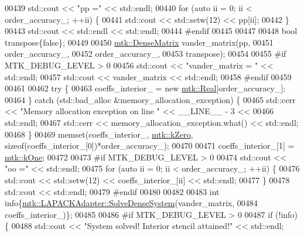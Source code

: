 \begin{DoxyCode}
{{00439   std::cout << \textcolor{stringliteral}{"pp ="} << std::endl;
00440   \textcolor{keywordflow}{for} (\textcolor{keyword}{auto} ii = 0; ii < order\_accuracy\_; ++ii) \{
00441     std::cout << std::setw(12) << pp[ii];
00442   \}
00443   std::cout << std::endl << std::endl;
00444 \textcolor{preprocessor}{  #endif}
00445 
00447 
00448   \textcolor{keywordtype}{bool} transpose\{\textcolor{keyword}{false}\};
00449 
00450   \hyperlink{classmtk_1_1DenseMatrix}{mtk::DenseMatrix} vander\_matrix(pp,
00451                                  order\_accuracy\_,
00452                                  order\_accuracy\_,
00453                                  transpose);
00454 
00455 \textcolor{preprocessor}{  #if MTK\_DEBUG\_LEVEL > 0}
00456   std::cout << \textcolor{stringliteral}{"vander\_matrix = "} << std::endl;
00457   std::cout << vander\_matrix << std::endl;
00458 \textcolor{preprocessor}{  #endif}
00459 
00461 
00462   \textcolor{keywordflow}{try} \{
00463     coeffs\_interior\_ = \textcolor{keyword}{new} \hyperlink{group__c01-roots_gac080bbbf5cbb5502c9f00405f894857d}{mtk::Real}[order\_accuracy\_];
00464   \} \textcolor{keywordflow}{catch} (std::bad\_alloc &memory\_allocation\_exception) \{
00465     std::cerr << \textcolor{stringliteral}{"Memory allocation exception on line "} << \_\_LINE\_\_ - 3 <<
00466       std::endl;
00467     std::cerr << memory\_allocation\_exception.what() << std::endl;
00468   \}
00469   memset(coeffs\_interior\_, \hyperlink{group__c01-roots_ga59a451a5fae30d59649bcda274fea271}{mtk::kZero}, \textcolor{keyword}{sizeof}(coeffs\_interior\_[0])*order\_accuracy\_);
00470 
00471   coeffs\_interior\_[1] = \hyperlink{group__c01-roots_ga26407c24d43b6b95480943340d285c71}{mtk::kOne};
00472 
00473 \textcolor{preprocessor}{  #if MTK\_DEBUG\_LEVEL > 0}
00474   std::cout << \textcolor{stringliteral}{"oo ="} << std::endl;
00475   \textcolor{keywordflow}{for} (\textcolor{keyword}{auto} ii = 0; ii < order\_accuracy\_; ++ii) \{
00476     std::cout << std::setw(12) << coeffs\_interior\_[ii] << std::endl;
00477   \}
00478   std::cout << std::endl;
00479 \textcolor{preprocessor}{  #endif}
00480 
00482 
00483   \textcolor{keywordtype}{int} info\{\hyperlink{classmtk_1_1LAPACKAdapter_a7428bccf74fd4a4af68fb7233846da22}{mtk::LAPACKAdapter::SolveDenseSystem}(vander\_matrix,
00484                                                 coeffs\_interior\_)\};
00485 
00486 \textcolor{preprocessor}{  #if MTK\_DEBUG\_LEVEL > 0}
00487   \textcolor{keywordflow}{if} (!info) \{
00488     std::cout << \textcolor{stringliteral}{"System solved! Interior stencil attained!"} << std::endl;
}}
\end{DoxyCode}
